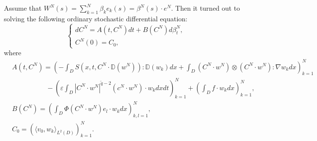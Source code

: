 \documentclass[reqno]{amsart}
\theoremstyle{definition}
\theoremstyle{remark}
\numberwithin{equation}{section} \allowdisplaybreaks
\begin{document}
Assume that $W^N(s)=\sum_{k=1}^N \beta_k e_k(s)=\beta^N(s)\cdot
e^N$. Then it turned out to solving the following ordinary
stochastic differential equation:
\begin{equation}\label{4.3}
\begin{cases}
dC^N=A(t,C^N)dt+B(C^N)d\beta_t^N,\\
C^N(0)=C_0,
\end{cases}
\end{equation}
where
\begin{align*}
&A(t,C^N)\!=\!\left(-\int_{D}S(x,t,C^N\cdot \mathbb{D}(w^N)):\mathbb{D}(w_k)dx+\int_{D}(C^N\cdot w^N)\otimes(C^N\cdot w^N):\nabla w_kdx\right)_{k=1}^N\\
&\qquad\qquad\quad-\left(\varepsilon\int_{D}|C^N\cdot
w^N|^{\tilde{q}-2}(c^N\cdot w^N)\cdot w_k
dxdt\right)_{k=1}^N+\left(\int_{D}f\cdot w_k dx\right)_{k=1}^N,\\
&B(C^N)\!=\!\left(\int_{D}\Phi(C^N\cdot w^N)e_l\cdot
w_kdx\right)_{k,l=1}^N,\\
&C_0=\left(\langle v_0,w_k\rangle_{L^2(D)}\right)_{k=1}^N.
\end{align*}
\end{document}
